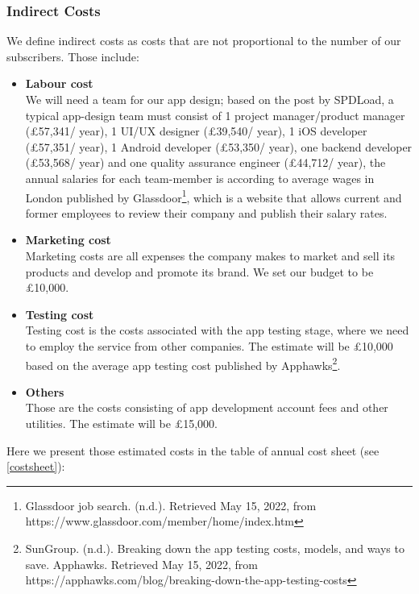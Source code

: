 \subsubsection{Indirect Costs}
We define indirect costs as costs that are not proportional to the number of our subscribers. Those include:
\begin{itemize}
\item \textbf{Labour cost}
\\We will need a team for our app design; based on the post by SPDLoad, a typical app-design team must consist of 1 project manager/product manager (£57,341/ year), 1 UI/UX designer (£39,540/ year), 1 iOS developer (£57,351/ year), 1 Android developer (£53,350/ year), one backend developer (£53,568/ year) and one quality assurance engineer (£44,712/ year), the annual salaries for each team-member is according to average wages in London published by Glassdoor\footnote{Glassdoor job search. (n.d.). Retrieved May 15, 2022, from https://www.glassdoor.com/member/home/index.htm }, which is a website that allows current and former employees to review their company and publish their salary rates.
\item \textbf{Marketing cost}
\\ Marketing costs are all expenses the company makes to market and sell its products and develop and promote its brand. We set our budget to be £10,000.
\item \textbf{Testing cost}
\\ Testing cost is the costs associated with the app testing stage, where we need to employ the service from other companies. The estimate will be £10,000 based on the average app testing cost published by Apphawks\footnote{SunGroup. (n.d.). Breaking down the app testing costs, models, and ways to save. Apphawks. Retrieved May 15, 2022, from https://apphawks.com/blog/breaking-down-the-app-testing-costs }.
\item \textbf{Others}
\\Those are the costs consisting of app development account fees and other utilities. The estimate will be £15,000.
\end{itemize}

Here we present those estimated costs in the table of annual cost sheet (see \cref{costsheet}):

